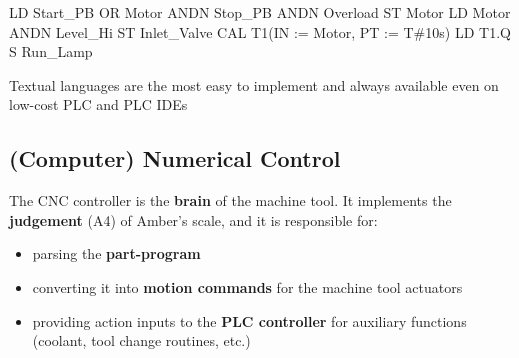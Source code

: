 \documentclass[
  letterpaper,
  DIV=11,
  numbers=noendperiod]{scrartcl}
\newenvironment{Shaded}{\begin{snugshade}}{\end{snugshade}}
\newcommand{\BuiltInTok}[1]{\textcolor[rgb]{0.00,0.23,0.31}{#1}}
\newcommand{\DecValTok}[1]{\textcolor[rgb]{0.68,0.00,0.00}{#1}}
\newcommand{\ErrorTok}[1]{\textcolor[rgb]{0.68,0.00,0.00}{#1}}
\newcommand{\NormalTok}[1]{\textcolor[rgb]{0.00,0.23,0.31}{#1}}
\newcommand{\OperatorTok}[1]{\textcolor[rgb]{0.37,0.37,0.37}{#1}}
\providecommand{\tightlist}{%
  \setlength{\itemsep}{0pt}\setlength{\parskip}{0pt}}
\begin{document}
\begin{codelisting}

\caption{\texttt{Instruction List (IL)}}

\begin{Shaded}
\begin{Highlighting}[]
\NormalTok{LD   Start\_PB}
\BuiltInTok{OR}\NormalTok{   Motor}
\BuiltInTok{ANDN}\NormalTok{ Stop\_PB}
\BuiltInTok{ANDN}\NormalTok{ Overload}
\NormalTok{ST   Motor}
\NormalTok{LD   Motor}
\BuiltInTok{ANDN}\NormalTok{ Level\_Hi}
\NormalTok{ST   Inlet\_Valve}
\NormalTok{CAL  T1}\OperatorTok{(}\NormalTok{IN }\OperatorTok{:=}\NormalTok{ Motor}\OperatorTok{,}\NormalTok{ PT }\OperatorTok{:=}\NormalTok{ T}\OperatorTok{\#}\DecValTok{10}\ErrorTok{s}\OperatorTok{)}
\NormalTok{LD   T1}\OperatorTok{.}\NormalTok{Q}
\NormalTok{S    Run\_Lamp}
\end{Highlighting}
\end{Shaded}

\end{codelisting}

\begin{tcolorbox}[enhanced jigsaw, arc=.35mm, bottomrule=.15mm, bottomtitle=1mm, breakable, colback=white, colbacktitle=quarto-callout-note-color!10!white, colframe=quarto-callout-note-color-frame, coltitle=black, left=2mm, leftrule=.75mm, opacityback=0, opacitybacktitle=0.6, rightrule=.15mm, title=\textcolor{quarto-callout-note-color}{\faInfo}\hspace{0.5em}{Note}, titlerule=0mm, toprule=.15mm, toptitle=1mm]

Textual languages are the most easy to implement and always available
even on low-cost PLC and PLC IDEs

\end{tcolorbox}

\subsection{(Computer) Numerical
Control}\label{computer-numerical-control}

The CNC controller is the \textbf{brain} of the machine tool. It
implements the \textbf{judgement} (A4) of Amber's scale, and it is
responsible for:

\begin{itemize}
\tightlist
\item
  parsing the \textbf{part-program}
\item
  converting it into \textbf{motion commands} for the machine tool
  actuators
\item
  providing action inputs to the \textbf{PLC controller} for auxiliary
  functions (coolant, tool change routines, etc.)
\end{itemize}
\end{document}
